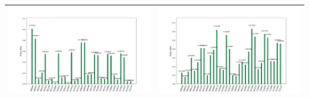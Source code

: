 \begin{landscape}
\begin{table}[ht]
\begin{tabular}{c c}
        \includegraphics[scale=0.32]{Grover_results/Grover_n=5,m=7.png} & \includegraphics[scale=0.32]{Grover_results/Grover_n=5,m=8.png} \\ \hline
    \end{tabular}
\end{table}
\end{landscape}

